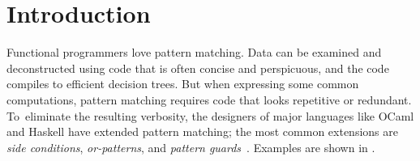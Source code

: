 \documentclass[runningheads]{llncs}
\begin{document}
\section{Introduction}
\label{pmandextensions}


Functional programmers
love pattern matching.
Data can be examined and deconstructed using code that is often
concise and perspicuous,
and the code compiles to efficient decision trees. %
But when expressing some common computations,
pattern matching requires code that looks repetitive or redundant. %
To~eliminate the resulting verbosity, the designers of major languages like OCaml and
Haskell have extended pattern matching;
the most common extensions are
\textit{side
conditions}, \textit{or-patterns}, and \textit{pattern
guards}~\cite{guardproposal}. %
Examples are shown in . %
\end{document}
